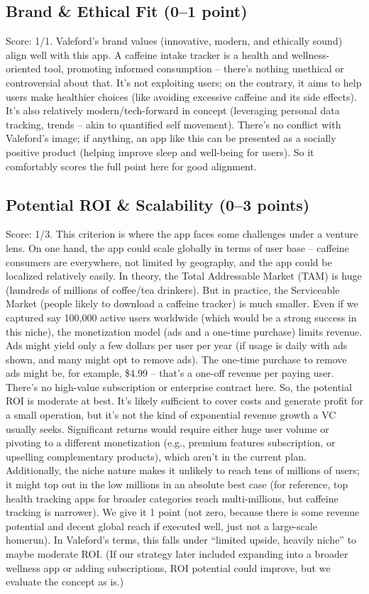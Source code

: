 \documentclass{article}
\begin{document}
\subsection{Brand \& Ethical Fit (0–1 point)}
Score: 1/1. Valeford’s brand values (innovative, modern, and ethically sound) align well with this app. A caffeine intake tracker is a health and wellness-oriented tool, promoting informed consumption – there’s nothing unethical or controversial about that. It’s not exploiting users; on the contrary, it aims to help users make healthier choices (like avoiding excessive caffeine and its side effects). It’s also relatively modern/tech-forward in concept (leveraging personal data tracking, trends – akin to quantified self movement). There’s no conflict with Valeford’s image; if anything, an app like this can be presented as a socially positive product (helping improve sleep and well-being for users). So it comfortably scores the full point here for good alignment\footnotemark[9].

\subsection{Potential ROI \& Scalability (0–3 points)}
Score: 1/3. This criterion is where the app faces some challenges under a venture lens. On one hand, the app could scale globally in terms of user base – caffeine consumers are everywhere, not limited by geography, and the app could be localized relatively easily. In theory, the Total Addressable Market (TAM) is huge (hundreds of millions of coffee/tea drinkers). But in practice, the Serviceable Market (people likely to download a caffeine tracker) is much smaller. Even if we captured say 100,000 active users worldwide (which would be a strong success in this niche), the monetization model (ads and a one-time purchase) limits revenue. Ads might yield only a few dollars per user per year (if usage is daily with ads shown, and many might opt to remove ads). The one-time purchase to remove ads might be, for example, \$4.99 – that’s a one-off revenue per paying user. There’s no high-value subscription or enterprise contract here. So, the potential ROI is moderate at best. It’s likely sufficient to cover costs and generate profit for a small operation, but it’s not the kind of exponential revenue growth a VC usually seeks. Significant returns would require either huge user volume or pivoting to a different monetization (e.g., premium features subscription, or upselling complementary products), which aren’t in the current plan. Additionally, the niche nature makes it unlikely to reach tens of millions of users; it might top out in the low millions in an absolute best case (for reference, top health tracking apps for broader categories reach multi-millions, but caffeine tracking is narrower). We give it 1 point (not zero, because there is some revenue potential and decent global reach if executed well, just not a large-scale homerun). In Valeford’s terms, this falls under “limited upside, heavily niche” to maybe moderate ROI\footnotemark[9]. (If our strategy later included expanding into a broader wellness app or adding subscriptions, ROI potential could improve, but we evaluate the concept as is.)
\end{document}
